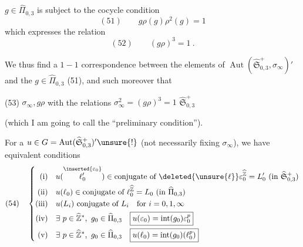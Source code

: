 
$g\in\widehat{\Pi}_{0,3}$  is subject to the cocycle condition
\[
(51)\qquad \boxed{g\rho(g)\rho^2(g)=1}
\]
which expresses the relation
\[
(52)\qquad (g\rho)^3=1\ .
\]

We thus find a $1-1$ correspondence between the elements of $\operatorname{Aut}(\widehat{\mathfrak S}_{0,3}^{+},\sigma_\infty)'$ and the $g\in\widehat{\Pi}_{0,3}$  (51), and such moreover that

(53) $\sigma_\infty,g\rho$ with the relations $\sigma_\infty^2=(g\rho)^3=1$  $\widehat{\mathfrak S}_{0,3}^{+}$


(which I am going to call the ``preliminary condition'').


For a $u\in G=\operatorname{Aut}(\widehat{\mathfrak S}_{0,3}^{+})'\unsure{!}$ (not necessarily fixing $\sigma_\infty$), we have equivalent conditions
\[
(54)\quad
\left\{\begin{aligned}
\text{(i)}\quad &u(\overset{\inserted{\varepsilon_0}}{\ell'_0})\in\text{conjugate of }\deleted{\unsure{\ell}}\varepsilon_0^{\widehat{\mathbb Z}}=L'_0\ (\text{in }\widehat{\mathfrak S}_{0,3}^{+})\\
\text{(ii)}\quad &u(\ell_0)\in\text{conjugate of }\ell_0^{\widehat{\mathbb Z}}=L_0\ (\text{in }\widehat{\Pi}_{0,3})\\
\text{(iii)}\quad &u(L_i)\text{ conjugate of }L_i\quad\text{for }i=0,1,\infty\\
\text{(iv)}\quad &\exists\ p\in\widehat{\mathbb Z}^{\ast},\ g_0\in\widehat{\Pi}_{0,3}\quad
\boxed{u(\varepsilon_0)=\operatorname{int}(g_0)\varepsilon_0^p}\\
\text{(v)}\quad &\exists\ p\in\widehat{\mathbb Z}^{\ast},\ g_0\in\widehat{\Pi}_{0,3}\quad
\boxed{u(\ell_0)=\operatorname{int}(g_0)(\ell_0^p)}
\end{aligned}\right.
\]

